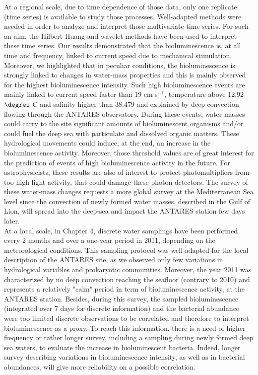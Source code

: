 
At a regional scale, due to time dependence of those data, only one replicate (time series) is available to study those processes. Well-adapted methods were needed in order to analyze and interpret those multivariate time series. For such an aim, the Hilbert-Huang and wavelet methods have been used to interpret these time series. Our results demonstrated that the bioluminescence is, at all time and frequency, linked to current speed due to mechanical stimulation. Moreover, we highlighted that in peculiar conditions, the bioluminescence is strongly linked to changes in water-mass properties and this is mainly observed for the highest bioluminescence intensity. Such high bioluminescence events are mainly linked to current speed faster than 19 cm s$^{-1}$, temperature above 12.92 $\degres$ C and salinity higher than 38.479 and explained by deep convection flowing through the ANTARES observatory. During these events, water masses could carry to the site significant amounts of bioluminescent organisms and/or could fuel the deep sea with particulate and dissolved organic matters. These hydrological movements could induce, at the end, an increase in the bioluminescence activity. Moreover, those threshold values are of great interest for the prediction of events of high bioluminescence activity in the future. For astrophysicists, these results are also of interest to protect photomultipliers from too high light activity, that could damage these photon detectors. The survey of these water-mass changes requests a more global survey at the Mediterranean Sea level since the convection of newly formed water masses, described in the Gulf of Lion, will spread into the deep-sea and impact the ANTARES station few days later.\\

At a local scale, in Chapter 4, discrete water samplings have been performed every 2 months and over a one-year period in 2011, depending on the meteorological conditions. This sampling protocol was well adapted for the local description of the ANTARES site, as we observed only few variations in hydrological variables and prokaryotic communities. Moreover, the year 2011 was characterized by no deep convection reaching the seafloor (contrary to 2010) and represents a relatively "calm" period in term of bioluminescence activity, at the ANTARES station. Besides, during this survey, the sampled bioluminescence (integrated over 7 days for discrete information) and the bacterial abundance were too limited discrete observations to be correlated and therefore to interpret bioluminescence as a proxy. To reach this information, there is a need of higher frequency or rather longer survey, including a sampling during newly formed deep sea waters, to evaluate the increase in bioluminescent bacteria. Indeed, longer survey describing variations in bioluminescence intensity, as well as in bacterial abundances, will give more reliability on a possible correlation.\\

